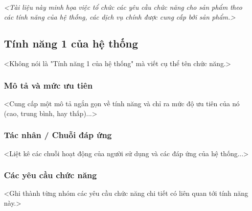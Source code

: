 
\newpage


\textit{<Tài liệu này minh họa việc tổ chức các yêu cầu chức năng cho sản phẩm theo các tính năng của hệ thống, các dịch vụ chính được cung cấp bởi sản phẩm.>}

\vspace{0.5cm}

\subsection{Tính năng 1 của hệ thống}

<Không nói là "Tính năng 1 của hệ thống" mà viết cụ thể tên chức năng.>

\vspace{0.3cm}

\subsubsection{Mô tả và mức ưu tiên}
<Cung cấp một mô tả ngắn gọn về tính năng và chỉ ra mức độ ưu tiên của nó (cao, trung bình, hay thấp)...>

\subsubsection{Tác nhân / Chuỗi đáp ứng}
<Liệt kê các chuỗi hoạt động của người sử dụng và các đáp ứng của hệ thống...>

\subsubsection{Các yêu cầu chức năng}
<Ghi thành từng nhóm các yêu cầu chức năng chi tiết có liên quan tới tính năng này.>


